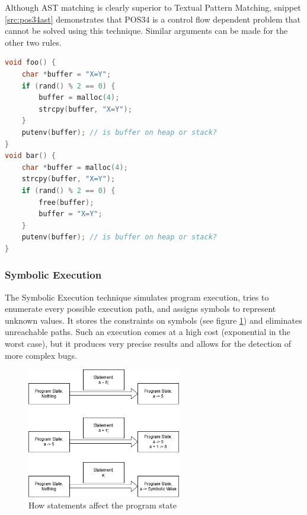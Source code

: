 Although AST matching is clearly superior to Textual Pattern Matching, snippet \ref{src:pos34ast} demonstrates that POS34 is a control flow dependent problem that cannot be solved using this technique.
Similar arguments can be made for the other two rules. 



\begin{lstlisting}[language={C++}]
void foo() {
    char *buffer = "X=Y";
    if (rand() % 2 == 0) {
        buffer = malloc(4);
        strcpy(buffer, "X=Y");
    }
    putenv(buffer); // is buffer on heap or stack?
}
void bar() {
    char *buffer = malloc(4);
    strcpy(buffer, "X=Y");
    if (rand() % 2 == 0) {
        free(buffer);
        buffer = "X=Y";
    }
    putenv(buffer); // is buffer on heap or stack?
}

\end{lstlisting}

\subsubsection{Symbolic Execution}
The Symbolic Execution technique simulates program execution, tries to enumerate every possible execution path, and assigns symbols to represent unknown values. It stores the constraints on symbols (see figure \ref{fig:state}) and eliminates unreachable paths. Such an execution comes at a high cost (exponential in the worst case), but it produces very precise results and allows for the detection of more complex bugs.


\begin{figure}[H]
	\centering
	\includegraphics[width=0.6\textwidth]{images/EG.png}
	\caption{How statements affect the program state}
	\label{fig:state}
\end{figure}



